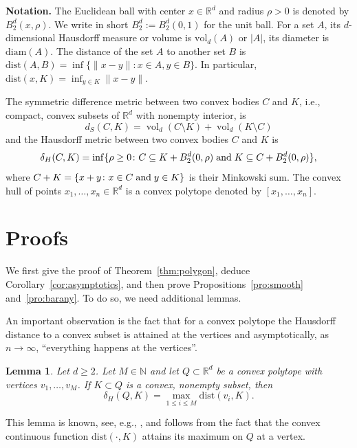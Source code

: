 \documentclass[a4paper,12pt]{article}
\newtheorem{lemma}[proposition]{Lemma}
\theoremstyle{definition}
\newcommand{\IR}{\mathbb{R}}
\newcommand{\dist}{\mathrm{dist}}
\newcommand{\diam}{\mathrm{diam}}
\newcommand{\vol}{\mathrm{vol}}
\begin{document}
\textbf{Notation. } The Euclidean ball with center $x\in\IR^d$ and radius $\rho>0$ is denoted by $B_{2}^{d}(x,\rho)$. We write  in short  $B_{2}^{d}:=B_{2}^{d}(0,1)$ for the unit ball.  For a set $A$,  its $d$-dimensional Hausdorff measure or volume is  $\vol_d(A)$ or $|A|$, its diameter is  $\diam(A)$.  The distance of the set $A$ to another set $B$ is 
$\dist(A,B) = \inf\{\|x-y\|:  x \in A, y \in B\}$. In particular, $\dist(x,K)=\inf_{y\in K}\|x-y\|$. 
\par
The symmetric difference metric between two convex bodies $C$ and $K$, i.e., compact, convex subsets of $\mathbb R^{d}$ with nonempty interior, is
$$
d_{S}(C,K)=\operatorname{vol}_{d}(C\setminus K)+\operatorname{vol}_{d}(K\setminus C)
$$
and the Hausdorff metric between two convex bodies $C$ and $K$ is
$$
\delta_{H}(C,K)=\inf\{\rho\ge 0\colon  C\subseteq K+B_{2}^{d}(0,\rho)\hskip 1mm\mbox{and}\hskip 1mm K\subseteq C+B_{2}^{d}(0,\rho)\},
$$
where $ C+K=\{x+y\colon x\in C \hskip 1mm\mbox{and}\hskip 1mm y\in K\} $ is their Minkowski sum. The convex hull of points $x_{1},\dots,x_{n}\in\mathbb R^{d}$ is a convex polytope denoted by $[x_{1},\dots,x_{n}]$. %


\section{Proofs}\label{Beweise}


We first give the proof of Theorem~\ref{thm:polygon}, deduce Corollary~\ref{cor:asymptotics}, and then prove Propositions~\ref{pro:smooth} and~\ref{pro:barany}.
To do so, we need additional  lemmas.

An important observation is  the fact that for a convex polytope the Hausdorff distance to a convex subset is attained at the vertices and asymptotically, as $n\to\infty$, ``everything happens at the vertices''. 

\begin{lemma} \label{lem:hd-vertex}
	Let $d\ge 2$. Let $M \in \mathbb{N}$ and let  $Q\subset\IR^d$ be a convex polytope with vertices $v_{1},\dots,v_M$. If  $K\subset Q$ is a convex,  nonempty subset, then 
	\[
	\delta_H(Q,K)
	=\max_{1\le i\le M} \dist(v_i,K).
	\]
\end{lemma}
This lemma is known, see, e.g., \cite[Lem. 2]{Bru19}, and follows from the fact that the convex continuous function $\dist(\cdot,K)$ attains its maximum on $Q$ at a vertex. 
\end{document}
